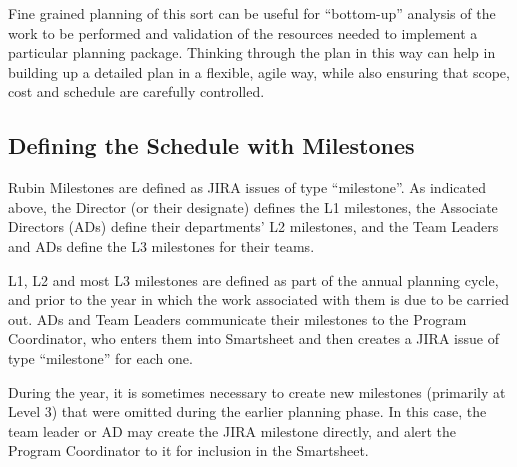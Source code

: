 \begin{itemize}
Fine grained planning of this sort can be useful for ``bottom-up''
analysis of the work to be performed and validation of the resources
needed to implement a particular planning package. Thinking through the
plan in this way can help in building up a detailed plan in a flexible,
agile way, while also ensuring that scope, cost and schedule are
carefully controlled.


\subsection{Defining the Schedule with Milestones}

Rubin Milestones are defined as \gls{JIRA} issues of type ``milestone''. As indicated above, the Director (or their designate) defines the L1 milestones, the Associate Directors (ADs) define their departments' L2 milestones, and the Team Leaders and ADs define the L3 milestones for their teams.

L1, L2 and most L3 milestones are defined as part of the annual planning cycle, and prior to the year in which the work associated with them is due to be carried out. ADs and Team Leaders communicate their milestones to the Program Coordinator, who enters them into Smartsheet and then creates a \gls{JIRA} issue of type ``milestone'' for each one.

During the year, it is sometimes necessary to create new milestones (primarily at Level 3) that were omitted during the earlier planning phase. In this case, the team leader or AD may create the \gls{JIRA} milestone directly, and alert the Program Coordinator to it for inclusion in the Smartsheet.


\end{itemize}
